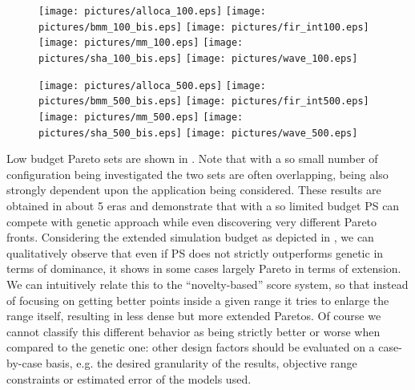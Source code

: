 \begin{figure}
  \begin{center}
    \texttt{[image: pictures/alloca\_100.eps]}
    \texttt{[image: pictures/bmm\_100\_bis.eps]}
    \texttt{[image: pictures/fir\_int100.eps]}
    \texttt{[image: pictures/mm\_100.eps]}
    \texttt{[image: pictures/sha\_100\_bis.eps]}
    \texttt{[image: pictures/wave\_100.eps]} 
  \end{center}
\end{figure}

\begin{figure}
  \begin{center}
    \texttt{[image: pictures/alloca\_500.eps]}
    \texttt{[image: pictures/bmm\_500\_bis.eps]}
    \texttt{[image: pictures/fir\_int500.eps]}
    \texttt{[image: pictures/mm\_500.eps]}
    \texttt{[image: pictures/sha\_500\_bis.eps]}
    \texttt{[image: pictures/wave\_500.eps]} 
  \end{center}
\end{figure}

Low budget Pareto sets are shown in . Note
that with a so small number of configuration being investigated the
two sets are often overlapping, being also strongly dependent upon the
application being considered.  These results are obtained in about 5
eras and demonstrate that with a so limited budget PS can compete with
genetic approach while even discovering very different Pareto fronts.
Considering the extended simulation budget as depicted in
, we can qualitatively observe that even if PS
does not strictly outperforms genetic in terms of dominance, it shows
in some cases largely Pareto in terms of extension. We can intuitively
relate this to the ``novelty-based'' score system, so that instead of
focusing on getting better points inside a given range it tries to
enlarge the range itself, resulting in less dense but more extended
Paretos. Of course we cannot classify this different behavior as
being strictly better or worse when compared to the genetic one: other
design factors should be evaluated on a case-by-case basis, e.g. the
desired granularity of the results, objective range constraints or
estimated error of the models used.

